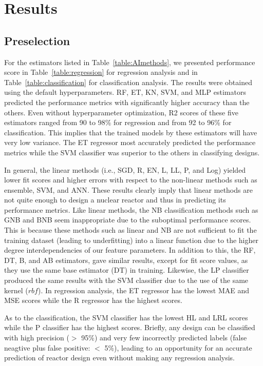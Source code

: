 \section{Results}

\subsection{Preselection}

    For the estimators listed in Table~\ref{table:AImethods}, we presented performance score in Table~\ref{table:regression} for regression analysis and in Table~\ref{table:classification} for classification analysis. The results were obtained using the default hyperparameters. \gls{RF}, \gls{ET}, \gls{KN}, \gls{SVM}, and \gls{MLP} estimators predicted the performance metrics with significantly higher accuracy than the others. Even without hyperparameter optimization, \gls{R2} scores of these five estimators ranged from 90 to 98\% for regression and from 92 to 96\% for classification. This implies that the trained models by these estimators will have very low variance. The \gls{ET} regressor most accurately predicted the performance metrics while the \gls{SVM} classifier was superior to the others in classifying designs.

    In general, the linear methods (i.e., \gls{SGD}, \gls{R}, \gls{EN}, \gls{L}, \gls{LL}, \gls{P}, and \gls{Log}) yielded lower fit scores and higher errors with respect to the non-linear methods such as ensemble, \gls{SVM}, and \gls{ANN}. These results clearly imply that linear methods are not quite enough to design a nuclear reactor and thus in predicting its performance metrics. Like linear methods, the \gls{NB} classification methods such as \gls{GNB} and \gls{BNB} seem inappropriate due to the suboptimal performance scores. This is because these methods such as linear and \gls{NB} are not sufficient to fit the training dataset (leading to underfitting) into a linear function due to the higher degree interdependencies of our feature parameters. In addition to this, the \gls{RF}, \gls{DT}, \gls{B}, and \gls{AB} estimators, gave similar results, except for fit score values, as they use the same base estimator (\gls{DT}) in training. Likewise, the \gls{LP} classifier produced the same results with the \gls{SVM} classifier due to the use of the same kernel ($rbf$). In regression analysis, the \gls{ET} regressor has the lowest \gls{MAE} and \gls{MSE} scores while the \gls{R} regressor has the highest scores.

    As to the classification, the \gls{SVM} classifier has the lowest \gls{HL} and \gls{LRL} scores while the \gls{P} classifier has the highest scores. Briefly, any design can be classified with high precision ($>$ 95\%) and very few incorrectly predicted labels (false neagtive plus false positive: $<$ 5\%), leading to an opportunity for an accurate prediction of reactor design even without making any regression analysis.

